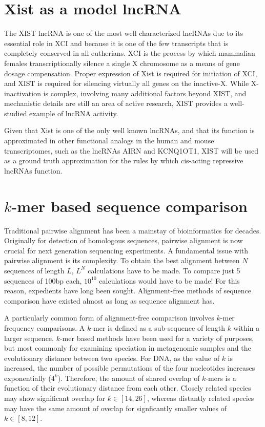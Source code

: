 \section{Xist as a model lncRNA}
The XIST lncRNA is one of the most well characterized lncRNAs due to its essential role in XCI and because it is one of the few transcripts that is completely conserved in all eutherians. XCI is the process by which mammalian females transcriptionally silence a single X chromosome as a means of gene dosage compensation. Proper expression of Xist is required for initiation of XCI, and XIST is required for silencing virtually all genes on the inactive-X. While X-inactivation is complex, involving many additional factors beyond XIST, and mechanistic details are still an area of active research, XIST provides a well-studied example of lncRNA activity.

Given that Xist is one of the only well known lncRNAs, and that its function is approximated in other functional analogs in the human and mouse transcriptomes, such as the lncRNAs AIRN and KCNQ1OT1, XIST will be used as a ground truth approximation for the rules by which cis-acting repressive lncRNAs function.

\section{$k$-mer based sequence comparison}
Traditional pairwise alignment has been a mainstay of bioinformatics for decades. Originally for detection of homologous sequences, pairwise alignment is now crucial for next generation sequencing experiments. A fundamental issue with pairwise alignment is its complexity. To obtain the best alignment between $N$ sequences of length $L$, $L^N$ calculations have to be made. To compare just 5 sequences of 100bp each, $10^{10}$ calculations would have to be made! For this reason, expedients have long been sought. Alignment-free methods of sequence comparison have existed almost as long as sequence alignment has.

A particularly common form of alignment-free comparison involves $k$-mer frequency comparisons. A $k$-mer is defined as a sub-sequence of length $k$ within a larger sequence. $k$-mer based methods have been used for a variety of purposes, but most commonly for examining speciation in metagenomic samples and the evolutionary distance between two species. For DNA, as the value of $k$ is increased, the number of possible permutations of the four nucleotides increases exponentially ($4^k$). Therefore, the amount of shared overlap of $k$-mers is a function of their evolutionary distance from each other. Closely related species may show significant overlap for $k\in[14,26]$, whereas distantly related species may have the same amount of overlap for signficantly smaller values of $k\in[8,12]$.

